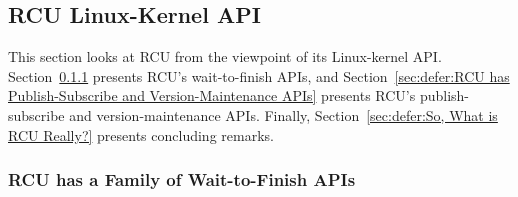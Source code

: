 
\subsection{RCU Linux-Kernel API}
\label{sec:defer:RCU Linux-Kernel API}

This section looks at RCU from the viewpoint of its Linux-kernel API.
Section~\ref{sec:defer:RCU has a Family of Wait-to-Finish APIs}
presents RCU's wait-to-finish APIs, and
Section~\ref{sec:defer:RCU has Publish-Subscribe and Version-Maintenance APIs}
presents RCU's publish-subscribe and version-maintenance APIs.
Finally,
Section~\ref{sec:defer:So, What is RCU Really?}
presents concluding remarks.

\subsubsection{RCU has a Family of Wait-to-Finish APIs}
\label{sec:defer:RCU has a Family of Wait-to-Finish APIs}


